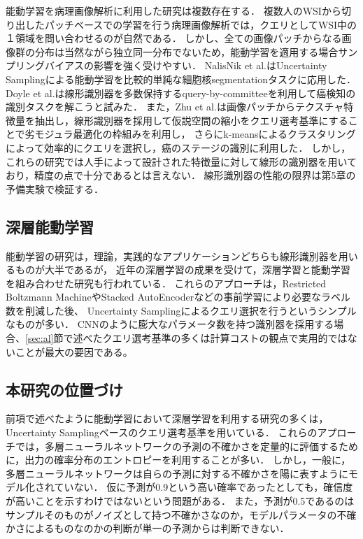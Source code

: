 能動学習を病理画像解析に利用した研究は複数存在する．
複数人のWSIから切り出したパッチベースでの学習を行う病理画像解析では，クエリとしてWSI中の１領域を問い合わせるのが自然である．
しかし、全ての画像パッチからなる画像群の分布は当然ながら独立同一分布でないため，能動学習を適用する場合サンプリングバイアスの影響を強く受けやすい．
NalisNik et al.はUncertainty Samplingによる能動学習を比較的単純な細胞核segmentationタスクに応用した\cite{nalisnik2017interactive}．
Doyle et al.は線形識別器を多数保持するquery-by-committeeを利用して癌検知の識別タスクを解こうと試みた\cite{doyle2011active}．
また，Zhu et al.は画像パッチからテクスチャ特徴量を抽出し，線形識別器を採用して仮説空間の縮小をクエリ選考基準にすることで劣モジュラ最適化の枠組みを利用し，
さらにk-meansによるクラスタリングによって効率的にクエリを選択し，癌のステージの識別に利用した\cite{zhu2014scalable}．
しかし，これらの研究では人手によって設計された特徴量に対して線形の識別器を用いており，精度の点で十分であるとは言えない．
線形識別器の性能の限界は第5章の予備実験で検証する．

\subsection{深層能動学習}
能動学習の研究は，理論，実践的なアプリケーションどちらも線形識別器を用いるものが大半であるが，
近年の深層学習の成果を受けて，深層学習と能動学習を組み合わせた研究も行われている\cite{6889457, li2016active}．
これらのアプローチは，Restricted Boltzmann MachineやStacked AutoEncoderなどの事前学習により必要なラベル数を削減した後、
Uncertainty Samplingによるクエリ選択を行うというシンプルなものが多い．
CNNのように膨大なパラメータ数を持つ識別器を採用する場合、\ref{sec:al}節で述べたクエリ選考基準の多くは計算コストの観点で実用的ではないことが最大の要因である。

\subsection{本研究の位置づけ}
前項で述べたように能動学習において深層学習を利用する研究の多くは，Uncertainty Samplingベースのクエリ選考基準を用いている．
これらのアプローチでは，多層ニューラルネットワークの予測の不確かさを定量的に評価するために，出力の確率分布のエントロピーを利用することが多い．
しかし，一般に，多層ニューラルネットワークは自らの予測に対する不確かさを陽に表すようにモデル化されていない．
仮に予測が0.9という高い確率であったとしても，確信度が高いことを示すわけではないという問題がある．
また，予測が0.5であるのはサンプルそのものがノイズとして持つ不確かさなのか，モデルパラメータの不確かさによるものなのかの判断が単一の予測からは判断できない．

